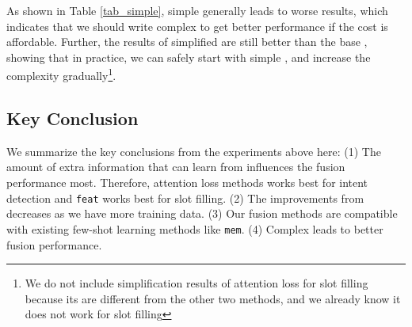 As shown in Table \ref{tab_simple}, simple \RE generally leads to worse results, which indicates that we should write complex \RE to get better performance if the cost is affordable.
Further, the results of simplified \RE are still better than the base \BLSTM, showing that in practice, we can safely start with simple \REs, and increase the complexity gradually\footnote{
We do not include simplification results of attention loss for slot filling because its \REs are different from the other two methods, and we already know it does not work for slot filling}.

\subsection{Key Conclusion}
We summarize the key conclusions from the experiments above here:
(1) The amount of extra information that \NN can learn from \RE influences the fusion performance most. Therefore, attention loss methods works best for intent detection and \texttt{feat} works best for slot filling.
(2) The improvements from \RE decreases as we have more training data.
(3) Our fusion methods are compatible with existing few-shot learning methods like \texttt{mem}.
(4) Complex \RE leads to better fusion performance.
